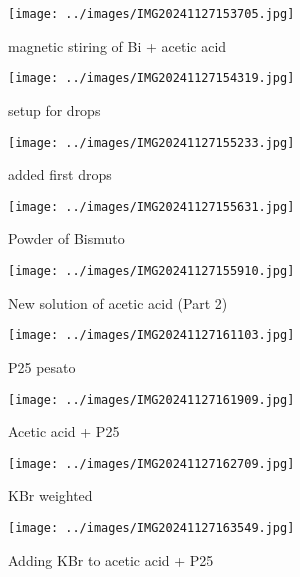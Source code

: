 \begin{figure}[ht]
    \centering
	\texttt{[image: ../images/IMG20241127153705.jpg]}
    \caption{magnetic stiring of Bi + acetic acid}
\end{figure}

\begin{figure}[ht]
    \centering
	\texttt{[image: ../images/IMG20241127154319.jpg]}
    \caption{setup for drops}
\end{figure}

\begin{figure}[ht]
    \centering
	\texttt{[image: ../images/IMG20241127155233.jpg]}
    \caption{added first drops}
\end{figure}

\begin{figure}[ht]
    \centering
	\texttt{[image: ../images/IMG20241127155631.jpg]}
    \caption{Powder of Bismuto}
\end{figure}

\begin{figure}[ht]
    \centering
	\texttt{[image: ../images/IMG20241127155910.jpg]}
    \caption{New solution of acetic acid (Part 2)}
\end{figure}

\begin{figure}[ht]
    \centering
	\texttt{[image: ../images/IMG20241127161103.jpg]}
    \caption{P25 pesato}
\end{figure}

\begin{figure}[ht]
    \centering
	\texttt{[image: ../images/IMG20241127161909.jpg]}
    \caption{Acetic acid + P25}
\end{figure}

\begin{figure}[ht]
    \centering
	\texttt{[image: ../images/IMG20241127162709.jpg]}
    \caption{KBr weighted}
\end{figure}

\begin{figure}[ht]
    \centering
	\texttt{[image: ../images/IMG20241127163549.jpg]}
    \caption{Adding KBr to acetic acid + P25}
\end{figure}

\\
\\
\\

